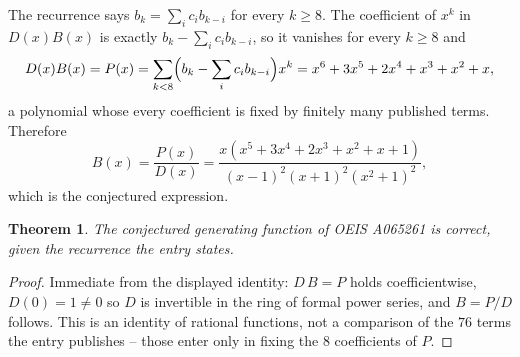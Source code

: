 \documentclass[11pt,a4paper]{article}
\theoremstyle{plain}
\newtheorem{theorem}{Theorem}
\theoremstyle{definition}
\begin{document}
The recurrence says $b_k=\sum_i c_ib_{k-i}$ for every $k\ge 8$. The coefficient of $x^k$ in
$D(x)B(x)$ is exactly $b_k-\sum_i c_ib_{k-i}$, so it vanishes for every $k\ge 8$ and
\[
  D(x)B(x)=P(x)=\sum_{k<8}\Bigl(b_k-\sum_i c_ib_{k-i}\Bigr)x^k
         =x^{6} + 3 x^{5} + 2 x^{4} + x^{3} + x^{2} + x ,
\]
a polynomial whose every coefficient is fixed by finitely many published terms. Therefore
\[
  B(x)=\frac{P(x)}{D(x)}=\frac{x \left(x^{5} + 3 x^{4} + 2 x^{3} + x^{2} + x + 1\right)}{\left(x - 1\right)^{2} \left(x + 1\right)^{2} \left(x^{2} + 1\right)^{2}} ,
\]
which is the conjectured expression.

\begin{theorem}
The conjectured generating function of OEIS A065261 is correct, given the recurrence the entry
states.
\end{theorem}

\begin{proof}
Immediate from the displayed identity: $D\,B=P$ holds coefficientwise, $D(0)=1\ne0$ so $D$ is
invertible in the ring of formal power series, and $B=P/D$ follows. This is an identity of
rational functions, not a comparison of the $76$ terms the entry publishes -- those
enter only in fixing the $8$ coefficients of $P$.
\end{proof}
\end{document}
